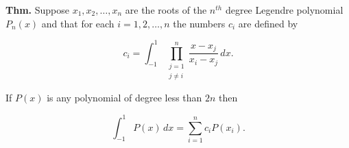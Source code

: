 \documentclass[12pt]{article}
\newcommand{\thm}{\textbf{Thm.}\xspace}
\begin{document}
\thm Suppose $x_1, x_2, \dots, x_n$ are the roots of the $n^{th}$ degree
Legendre polynomial $P_n(x)$ and that for each $i=1, 2, \dots, n$ the numbers
$c_i$ are defined by

\begin{equation*}
  c_i = \int_{-1}^{1} \prod_{\substack{j = 1 \\ j \ne i}}^{n} \frac{x-x_j}{x_i-x_j} \, dx
.\end{equation*}

If $P(x)$ is any polynomial of degree less than $2n$ then

\begin{equation*}
  \int_{-1}^{1} P(x) \, dx = \sum_{i=1}^{n} c_i P(x_i)
.\end{equation*}
\end{document}
